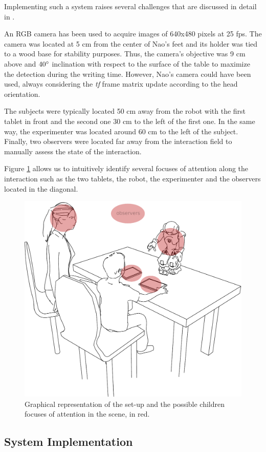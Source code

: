 \documentclass{sig-alternate}
\begin{document}
Implementing such a system raises several challenges that are discussed in
detail in \cite{Hood:2015}.

An RGB camera has been used to acquire images of 640x480 pixels at 25 fps. The
camera was located at 5 cm from the center of Nao's feet and its holder was tied
to a wood base for stability purposes. Thus, the camera's objective was 9 cm
above and $ 40\degree $ inclination with respect to the surface of the table to
maximize the detection during the writing time. However, Nao's camera could have
been used, always considering the \textit{tf} frame matrix update according to
the head orientation.

The subjects were typically located 50 cm away from the robot with the first
tablet in front and the second one 30 cm to the left of the first one. In the
same way, the experimenter was located around 60 cm to the left of the subject.
Finally, two observers were located far away from the interaction field to
manually assess the state of the interaction.

Figure \ref{drawSetup} allows us to intuitively identify several focuses of
attention along the interaction such as the two tablets, the robot, the
experimenter and the observers located in the diagonal.

\begin{figure}[h!]
    \centering
    \includegraphics[width=0.7\columnwidth]{drawSetup}
    \caption{\small Graphical representation of the set-up and the possible children focuses of attention in the scene, in red.}
    \label{drawSetup}
\end{figure}

\subsection{System Implementation}
\end{document}
